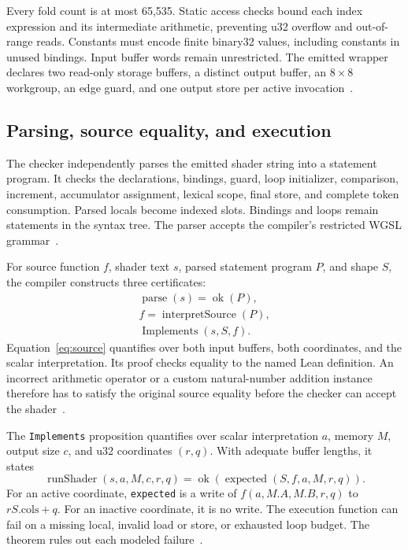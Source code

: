 \documentclass[11pt]{article}
\newcommand{\code}[1]{\texttt{#1}}
\begin{document}
Every fold count is at most 65,535.  Static access checks bound each index expression and its intermediate arithmetic, preventing u32 overflow and out-of-range reads.  Constants must encode finite binary32 values, including constants in unused bindings.  Input buffer words remain unrestricted.  The emitted wrapper declares two read-only storage buffers, a distinct output buffer, an $8\times8$ workgroup, an edge guard, and one output store per active invocation~\cite{compiler,execution}.

\subsection{Parsing, source equality, and execution}

The checker independently parses the emitted shader string into a statement program.  It checks the declarations, bindings, guard, loop initializer, comparison, increment, accumulator assignment, lexical scope, final store, and complete token consumption.  Parsed locals become indexed slots.  Bindings and loops remain statements in the syntax tree.  The parser accepts the compiler's restricted WGSL grammar~\cite{compiler}.

For source function $f$, shader text $s$, parsed statement program $P$, and shape $S$, the compiler constructs three certificates:
\begin{gather}
\operatorname{parse}(s)=\operatorname{ok}(P),\label{eq:parse}\\
f=\operatorname{interpretSource}(P),\label{eq:source}\\
\operatorname{Implements}(s,S,f).\label{eq:implements}
\end{gather}
Equation~\eqref{eq:source} quantifies over both input buffers, both coordinates, and the scalar interpretation.  Its proof checks equality to the named Lean definition.  An incorrect arithmetic operator or a custom natural-number addition instance therefore has to satisfy the original source equality before the checker can accept the shader~\cite{compiler}.

The \code{Implements} proposition quantifies over scalar interpretation $a$, memory $M$, output size $c$, and u32 coordinates $(r,q)$.  With adequate buffer lengths, it states
\[
\operatorname{runShader}(s,a,M,c,r,q)
=\operatorname{ok}(\operatorname{expected}(S,f,a,M,r,q)).
\]
For an active coordinate, \code{expected} is a write of $f(a,M.A,M.B,r,q)$ to $rS.\mathrm{cols}+q$.  For an inactive coordinate, it is no write.  The execution function can fail on a missing local, invalid load or store, or exhausted loop budget.  The theorem rules out each modeled failure~\cite{execution}.
\end{document}
